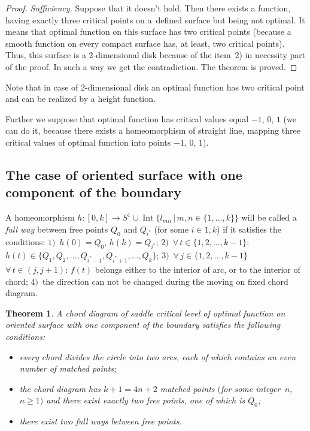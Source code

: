 \documentclass[pdftex]{sigma}
\numberwithin{equation}{section}
\newtheorem{Theorem}{Theorem}[section]
\begin{document}
\begin{proof}
\emph{Sufficiency.} Suppose that it doesn't hold. Then there exists a function, having exactly three critical points on a~def\/ined surface but being not optimal. It means that optimal function on this surface has two critical points (because a smooth function on every compact surface has, at least, two critical points). Thus, this surface is a 2-dimensional disk because of the item~2) in necessity part of the proof. In such a way we get the contradiction. The theorem is proved.
\end{proof}

Note that in case of 2-dimensional disk an optimal function has two critical point and can be realized by a height function.

Further we suppose that optimal function has critical values equal $-1$, $0$, $1$ (we can do it, because there exists a homeomorphism of straight line, mapping three critical values of optimal function into points $-1$, $0$, $1$).

\subsection{The case of oriented surface with one component of the boundary}

\begin{Definition}\label{definition4.2}
A homeomorphism $h\colon [0,k] \rightarrow S^{1}\cup \operatorname{Int}\{l_{mn}\,|\,m,n\in\{1,\ldots,k\}\}$ will be called a \emph{full way} between free points $Q_{0}$ and $Q_{i^{*}}$ (for some $i\in\overline{1,k}$) if it satisf\/ies the conditions: $1)$~$h(0)=Q_{0}$, $h(k)=Q_{i^{*}}$; $2)$~$\forall\, t\in\{1,2,\ldots,k-1\}$: $h(t)\in\{Q_{1},Q_{2},\ldots,Q_{i^{*}-1},Q_{i^{*}+1},\ldots,Q_{k}\}$; $3)$~$\forall\, j\in\{1,2,\ldots,k-1\}$ $\forall\, t\in(j,j+1)$: $f(t)$ belongs either to the interior of arc, or to the interior of chord; $4)$~the direction can not be changed during the moving on f\/ixed chord diagram.
\end{Definition}

\begin{Theorem}\label{theorem4.2}
A chord diagram of saddle critical level of optimal function on oriented surface with one component of the boundary satisfies the following conditions:
\begin{itemize}\itemsep=0pt
\item[$1)$] every chord divides the circle into two arcs, each of which contains an even number of matched points;
\item[$2)$] the chord diagram has $k+1=4n+2$ matched points $($for some integer~$n$, $n\geq1)$ and there exist exactly two free points, one of which is $Q_{0}$;
\item[$3)$] there exist two full ways between free points.
\end{itemize}
\end{Theorem}
\end{document}
